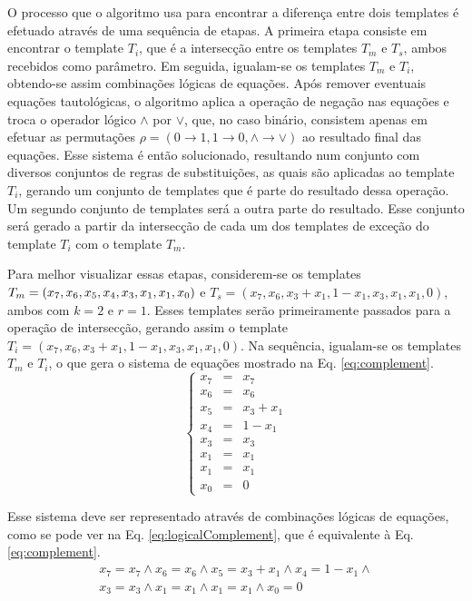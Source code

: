 O processo que o algoritmo usa para encontrar a diferença entre dois templates é efetuado através de uma sequência de etapas. A primeira etapa consiste em encontrar o template $T_i$, que é a intersecção entre os templates $T_m$ e $T_s$, ambos recebidos como parâmetro. Em seguida, igualam-se os templates $T_m$ e $T_i$, obtendo-se assim combinações lógicas de equações. Após remover eventuais equações tautológicas, o algoritmo aplica a operação de negação nas equações e troca o operador lógico $\wedge$ por $\vee$, que, no caso binário, consistem apenas em efetuar as permutações $\rho = (0 \rightarrow 1, 1 \rightarrow 0, \wedge \rightarrow \vee)$ ao resultado final das equações. Esse sistema é então solucionado, resultando num conjunto com diversos conjuntos de regras de substituições, as quais são aplicadas ao template $T_i$, gerando um conjunto de templates que é parte do resultado dessa operação. Um segundo conjunto de templates será a outra parte do resultado. Esse conjunto será gerado a partir da intersecção de cada um dos templates de exceção do template $T_i$ com o template $T_m$.

Para melhor visualizar essas etapas, considerem-se os templates $T_m = (x_7, x_6, x_5, x_4, x_3,\\ x_1, x_1, x_0)$ e $T_s = (x_7, x_6, x_3 + x_1, 1 - x_1, x_3, x_1, x_1, 0)$, ambos com $k=2$ e $r=1$. Esses templates serão primeiramente passados para a operação de intersecção, gerando assim o template $T_i = (x_7, x_6, x_3 + x_1, 1 - x_1, x_3, x_1, x_1, 0)$. Na sequência, igualam-se os templates $T_m$ e $T_i$, o que gera o sistema de equações mostrado na Eq. \eqref{eq:complement}.
\begin{equation}
\left\{\begin{matrix}
x_7 & = & x_7	\\ 
x_6 & = & x_6	\\ 
x_5 & = & x_3 + x_1	\\ 
x_4 & = & 1 - x_1 \\ 
x_3 & = & x_3	\\ 
x_1 & = & x_1	\\ 
x_1 & = & x_1	\\ 
x_0 & = & 0
\end{matrix}\right.
\label{eq:complement}
\end{equation}

Esse sistema deve ser representado através de combinações lógicas de equações, como se pode ver na Eq. \eqref{eq:logicalComplement}, que é equivalente à Eq. \eqref{eq:complement}.
\begin{equation}
\begin{split}
x_7 = x_7	\wedge  
x_6 = x_6	\wedge  
x_5 = x_3 + x_1	\wedge  
x_4 =   1 - x_1 \wedge  \\
x_3 = x_3	\wedge  
x_1 = x_1	\wedge  
x_1 = x_1	\wedge  
x_0 = 0
\end{split}
\label{eq:logicalComplement}
\end{equation}

